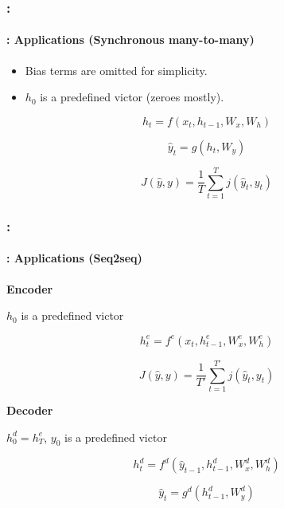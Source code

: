 \documentclass[xcolor=table]{beamer}
\begin{document}
\begin{frame}
	\frametitle{\insertshortsubtitle: \insertsection}
	\framesubtitle{\insertsubsection: Applications (Synchronous many-to-many)}
	
	\begin{minipage}{0.53\textwidth}
		\begin{itemize}
			\item Bias terms are omitted for simplicity.
			\item $h_0$ is a predefined victor (zeroes mostly).
		\end{itemize}
		
		\[ h_t = f(x_t, h_{t-1}, W_x, W_h)\]
		
		\[ \hat{y}_t = g(h_t, W_y)\]
		
		\[ J(\hat{y}, y) = \frac{1}{T} \sum_{t=1}^{T} j(\hat{y}_t, y_t)\]
	\end{minipage}
	\begin{minipage}{0.45\textwidth}
	\end{minipage}
	
\end{frame}

\begin{frame}
	\frametitle{\insertshortsubtitle: \insertsection}
	\framesubtitle{\insertsubsection: Applications (Seq2seq)}
	
	\begin{minipage}{0.45\textwidth}
		\centering\vskip8pt
		\textbf{Encoder}
		
		$h_0$ is a predefined victor
		
		\[ h^e_t = f^e(x_t, h^e_{t-1}, W^e_x, W^e_h) \]
		
		\[ J(\hat{y}, y) = \frac{1}{T'} \sum_{t=1}^{T'} j(\hat{y}_{t}, y_t)\]
		
	\end{minipage}
	\begin{minipage}{0.45\textwidth}
		\centering
		\textbf{Decoder}
		
		$h^d_{0} = h^e_{T}$, $y_0$ is a predefined victor
		
		\[h^d_{t} = f^d(\hat{y}_{t-1}, h^d_{t-1}, W^d_x, W^d_h)\]
		
		\[ \hat{y}_{t} = g^d(h^d_{t-1}, W^d_y)\]
	\end{minipage}
	
	\vspace{-12pt}
	\begin{center}
	\end{center}
	
\end{frame}
\end{document}
